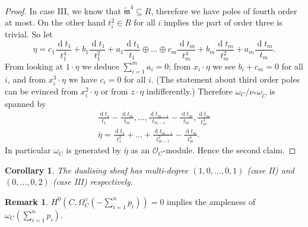\documentclass[11pt]{amsart}
\newcommand{\tm}{\widetilde{\mathfrak m}}
\newcommand{\OO}{\mathcal O}
\theoremstyle{plain}
\newtheorem{cor}[thm]{Corollary}
\theoremstyle{definition}
\newtheorem{rem}[thm]{Remark}
\begin{document}
\begin{proof}
In case III, we know that $\tm^4\subseteq R$, therefore we have poles of fourth order at most. On the other hand $t_i^2\in R$ for all $i$ implies the part of order three is trivial. So let \[\eta=c_1\frac{\operatorname{d}t_1}{t_1^4}+b_1\frac{\operatorname{d}t_1}{t_1^2}+a_1\frac{\operatorname{d}t_1}{t_1}\oplus\ldots\oplus c_m\frac{\operatorname{d}t_m}{t_m^4}+b_m\frac{\operatorname{d}t_m}{t_m^2}+a_m\frac{\operatorname{d}t_m}{t_m}.\]
 From looking at $1\cdot\eta$ we deduce $\sum_{i=1}^m a_i=0$; from $x_i\cdot\eta$ we see $b_i+c_m=0$ for all $i$, and from $x_i^3\cdot\eta$ we have $c_i=0$ for all $i$. (The statement about third order poles can be evinced from $x_i^2\cdot\eta$ or from $z\cdot\eta$ indifferently.) Therefore $\omega_C/\nu_*\omega_{\tilde C}$ is spanned by
 \begin{align*}
  \frac{\operatorname{d}t_1}{t_1}-\frac{\operatorname{d}t_m}{t_m},\ldots,\frac{\operatorname{d}t_{m-1}}{t_{m-1}}-\frac{\operatorname{d}t_m}{t_m},\frac{\operatorname{d}t_m}{t_m^2}\\
  \bar{\eta}=\frac{\operatorname{d}t_1}{t_1^2}+\ldots+\frac{\operatorname{d}t_{m-1}}{t_{m-1}^2}-\frac{\operatorname{d}t_m}{t_m^4}.
 \end{align*}
In particular $\omega_C$ is generated by $\bar{\eta}$ as an $\OO_C$-module. Hence the second claim.
\end{proof}

\begin{cor}
 The dualising sheaf has multi-degree $(1,0,\ldots,0,1)$ (case II) and $(0,\ldots,0,2)$ (case III) respectively.
\end{cor}

\begin{rem}
 $H^0(C,\Omega_C^\vee(-\sum_{i=1}^np_i))=0$ implies the ampleness of $\omega_C(\sum_{i=1}^np_i)$.
\end{rem}
\end{document}
